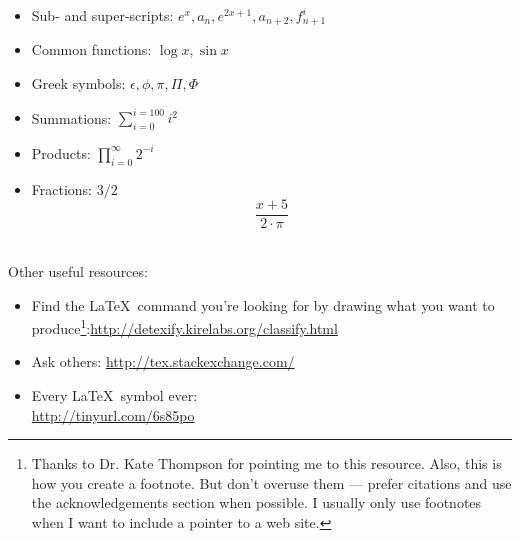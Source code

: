 \begin{itemize}
  \item Sub- and super-scripts: $e^{x}, a_{n}, e^{2x+1}, a_{n+2}, f^{i}_{n+1}$
  \item Common functions: $\log{x}, \sin{x}$
  \item Greek symbols: $\epsilon, \phi, \pi, \Pi, \Phi$ %
  \item Summations: $\sum_{i=0}^{i=100} i^{2}$ %
  \item Products: $\prod_{i=0}^{\infty} 2^{-i}$
  \item Fractions: $3/2$ %
    $$\frac{x + 5}{2 \cdot \pi}$$\\ %
\end{itemize}

\noindent Other useful resources:
\begin{itemize}
\item Find the \LaTeX~command you're looking for by drawing what you
  want to produce\footnote{Thanks to Dr. Kate Thompson for pointing me
    to this resource. Also, this is how you create a footnote. But
    don't overuse them --- prefer citations and use the
    acknowledgements section when possible. I usually only use
    footnotes when I want to include a pointer to a web
    site.}:\url{http://detexify.kirelabs.org/classify.html}
\item Ask others: \url{http://tex.stackexchange.com/}
\item Every \LaTeX~symbol ever:\\ \url{http://tinyurl.com/6s85po}

\end{itemize}


